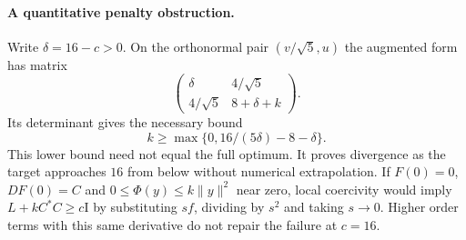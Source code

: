 \documentclass[11pt,a4paper]{article}
\newcommand{\id}{\mathrm I}
\begin{document}
\paragraph{A quantitative penalty obstruction.}
Write $\delta=16-c>0$. On the orthonormal pair $(v/\sqrt5,u)$ the
augmented form has matrix
\[
 \begin{pmatrix}\delta&4/\sqrt5\\4/\sqrt5&8+\delta+k\end{pmatrix}.
\]
Its determinant gives the necessary bound
\begin{equation}\label{eq:blowup}
 k\geq\max\{0,16/(5\delta)-8-\delta\}.
\end{equation}
This lower bound need not equal the full optimum. It proves divergence
as the target approaches $16$ from below without numerical extrapolation.
If $F(0)=0$, $DF(0)=C$ and $0\leq\Phi(y)\leq k\|y\|^2$ near zero,
local coercivity would imply $L+kC^*C\geq c\id$ by substituting $sf$,
dividing by $s^2$ and taking $s\to0$. Higher order terms with this same
derivative do not repair the failure at $c=16$.
\end{document}
